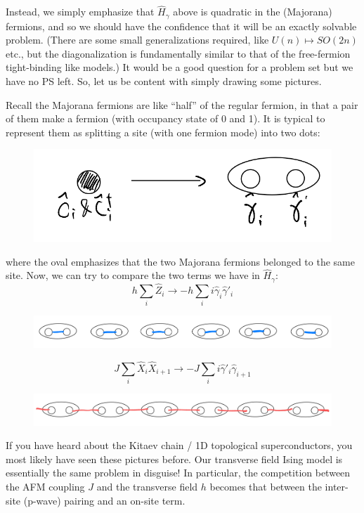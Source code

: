 Instead, we simply emphasize that $\hat{H}_\gamma$ above is quadratic in the (Majorana) fermions, and so we should have the confidence that it will be an exactly solvable problem. (There are some small generalizations required, like $U(n)\mapsto SO(2n)$ etc., but the diagonalization is fundamentally similar to that of the free-fermion tight-binding like models.) It would be a good question for a problem set but we have no PS left. So, let us be content with simply drawing some pictures.

Recall the Majorana fermions are like ``half'' of the regular fermion, in that a pair of them make a fermion (with occupancy state of 0 and 1). It is typical to represent them as splitting a site (with one fermion mode) into two dots:
\begin{figure}[H]
    \centering
    \includegraphics[width=\textwidth]{jupyterbook/data/fig/lec26-fig03.png}
\end{figure}
where the oval emphasizes that the two Majorana fermions belonged to the same site. Now, we can try to compare the two terms we have in $\hat{H}_\gamma$:
\[ h\sum_i{\hat{Z}_i}\rightarrow -h\sum_i{i\hat{\gamma}_i\hat{\gamma}'_i}\]
\begin{figure}[H]
    \centering
    \includegraphics[width=\textwidth]{jupyterbook/data/fig/lec26-fig04.png}
\end{figure}
\[ J\sum_i{\hat{X}_i\hat{X}_{i+1}}\rightarrow -J\sum_i{i\hat{\gamma}'_i\hat{\gamma}_{i+1}}\]
\begin{figure}[H]
    \centering
    \includegraphics[width=\textwidth]{jupyterbook/data/fig/lec26-fig05.png}
\end{figure}
If you have heard about the Kitaev chain / 1D topological superconductors, you most likely have seen these pictures before. Our transverse field Ising model is essentially the same problem in disguise! In particular, the competition between the AFM coupling $J$ and the transverse field $h$ becomes that between the inter-site (p-wave) pairing and an on-site term.

